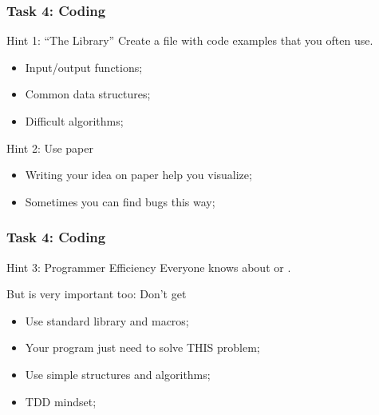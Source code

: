 \documentclass{beamer}
\begin{document}
\begin{frame}
  \frametitle{Task 4: Coding}
  \begin{exampleblock}{Hint 1: ``The Library''}
    Create a file with code examples that you often use.
    \begin{itemize}
    \item Input/output functions;
    \item Common data structures;
    \item Difficult algorithms;
    \end{itemize}
   \end{exampleblock}

   \begin{block}{Hint 2: Use paper}
    \begin{itemize}
    \item Writing your idea on paper help you visualize;
    \item Sometimes you can find bugs this way;
    \end{itemize}
  \end{block}
\end{frame}

\begin{frame}
  \frametitle{Task 4: Coding} 

  \begin{block}{Hint 3: Programmer Efficiency}
    Everyone knows about  or
    .

    \bigskip

    But  is very important too: Don't
    get 
  \end{block}

  \vfill
  
  \begin{itemize}
  \item Use standard library and macros;
  \item Your program just need to solve THIS problem;
  \item Use simple structures and algorithms;
  \item TDD mindset;
  \end{itemize}
\end{frame}
\end{document}
